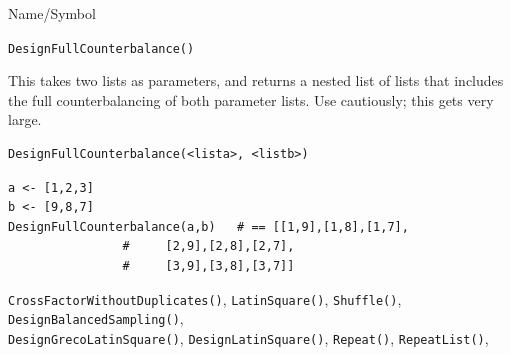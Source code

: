 \begin{desc}{Name/Symbol}

\item[Name/Symbol]	\verb+DesignFullCounterbalance()+

\item[Description]	This takes two lists as parameters, and returns a nested list 
		of lists that includes the full counterbalancing of both 
		parameter lists.  Use cautiously; this gets very large.

\item[Usage]
\begin{verbatim}
DesignFullCounterbalance(<lista>, <listb>)
\end{verbatim}

\item[Example]
\begin{verbatim}
a <- [1,2,3]
b <- [9,8,7]
DesignFullCounterbalance(a,b)	# == [[1,9],[1,8],[1,7],
				#     [2,9],[2,8],[2,7],
				#     [3,9],[3,8],[3,7]]
\end{verbatim}

\item[See Also] \verb+CrossFactorWithoutDuplicates()+,
  \verb+LatinSquare()+, \verb+Shuffle()+,
  \verb+DesignBalancedSampling()+, 
\\\verb+DesignGrecoLatinSquare()+, 
  \verb+DesignLatinSquare()+, \verb+Repeat()+, \verb+RepeatList()+,

\end{desc}






